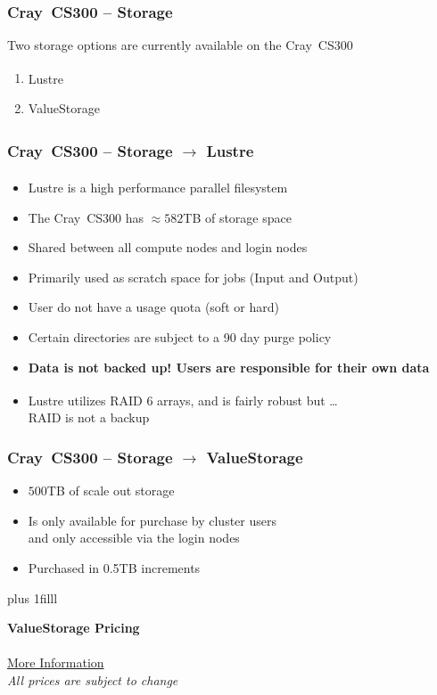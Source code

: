 \documentclass[t,hyperref={pdfpagelabels=false}]{beamer}
\newcommand{\regtrademark}{\fontsize{5}{6}\selectfont \textsuperscript{\textregistered}}
\newcommand{\btVFill}{\vskip0pt plus 1filll}
\newcommand{\lustre}{Lustre{\regtrademark}}
\newcommand{\craycs}{Cray~CS300}
\begin{document}
\begin{frame}
	\frametitle{{\craycs} -- Storage}
	Two storage options are currently available on the {\craycs}
	\begin{enumerate}
		\item {\lustre}
		\item ValueStorage
	\end{enumerate}
\end{frame}


\begin{frame}
	\frametitle{{\craycs} -- Storage $\rightarrow$ {\lustre}}
	\begin{itemize}
		\item {\lustre} is a high performance parallel filesystem
		\item The {\craycs} has $\approx582$TB of storage space
		\item Shared between all compute nodes and login nodes
		\item Primarily used as scratch space for jobs (Input and Output)
		\item User do not have a usage quota (soft or hard)
		\item Certain directories are subject to a 90 day purge policy
		\item \textbf{Data is not backed up!  Users are responsible for their own data}
                \item {\lustre} utilizes RAID 6 arrays, and is fairly robust but \ldots~\\RAID is not a backup
	\end{itemize}
\end{frame}


\begin{frame}
	\frametitle{{\craycs} -- Storage $\rightarrow$ ValueStorage}
	\begin{itemize}
		\item $500$TB of scale out storage
		\item Is only available for purchase by cluster users~\\and only accessible via the login nodes
		\item Purchased in 0.5TB increments
	\end{itemize}
	\btVFill

	\begin{center}
	\textbf{ValueStorage Pricing}~\\ 
		~\\ \href{http://www.hawaii.edu/its/value-storage-pricing/}{More Information}
		~\\	{\footnotesize \emph{All prices are subject to change}}
	\end{center}
\end{frame}
\end{document}
